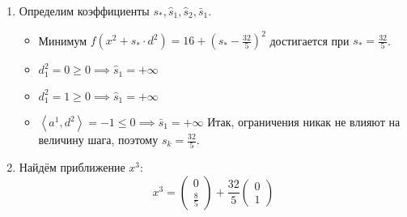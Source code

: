 \documentclass{article}
\renewcommand{\leq}{\leqslant}
\renewcommand{\geq}{\geqslant}
\newcommand{\mul}{\cdot}
\newcommand{\scalmult}[1]{{\left \langle #1 \right \rangle}}
\theoremstyle{remark}
\theoremstyle{definition}
\numberwithin{equation}{section}
\begin{document}
\begin{enumerate}
\begin{enumerate}
    ряду:
    \begin{equation*}
      \begin{gmatrix}[b]
        \dagger & d_1 & d_{2+} & d_{2-} & x_1 & \diamond\\
        x_1 & 1 & 1 & 1 & 1 & 1 \\
        \tilde{f}_2 & -\frac{43}{5} & 0 & -\frac{6}{5} & -\frac{3}{5}
        & -\frac{3}{5}
      \end{gmatrix}
    \end{equation*}
    При этом условие $d_{2+} \mul d_{2-} = 0$ выполнено. Итак, найдено
    оптимальное решение задачи линейного программирования:
    \begin{equation*}
      \begin{cases}
        d_{1\phantom{+}} = 0 \\
        d_{2+} = 1 \\
        d_{2-} = 0
      \end{cases}
    \end{equation*}
    с учётом которого построим вектор $d^2$:
    \begin{equation*}
      d^2 = \begin{pmatrix} 0 \\ 1 \end{pmatrix}
    \end{equation*}
  \item Определим коэффициенты $s_*, \hat{s}_1, \hat{s}_2, \bar{s}_1$.
    \begin{itemize}
    \item Минимум $f(x^2+s_*\mul d^2) = 16+(s_*-\frac{32}{5})^2$
      достигается при $s_* = \frac{32}{5}$.
    \item $d^2_1 = 0 \geq 0 \implies \hat{s}_1 = +\infty$
    \item $d^2_1 = 1 \geq 0 \implies \hat{s}_1 = +\infty$
    \item $\scalmult{a^1, d^2} = -1 \leq 0 \implies \bar{s}_1 =
      +\infty$ Итак, ограничения никак не влияют на величину шага,
      поэтому $s_k = \frac{32}{5}$.
    \end{itemize}
  \item Найдём приближение $x^3$:
    \begin{equation*}
      x^3 = \begin{pmatrix} 0 \\ \frac{8}{5} \end{pmatrix} +
      \frac{32}{5} \begin{pmatrix} 0 \\ 1 \end{pmatrix}

\end{equation*}
\end{enumerate}
\end{enumerate}
\end{document}
